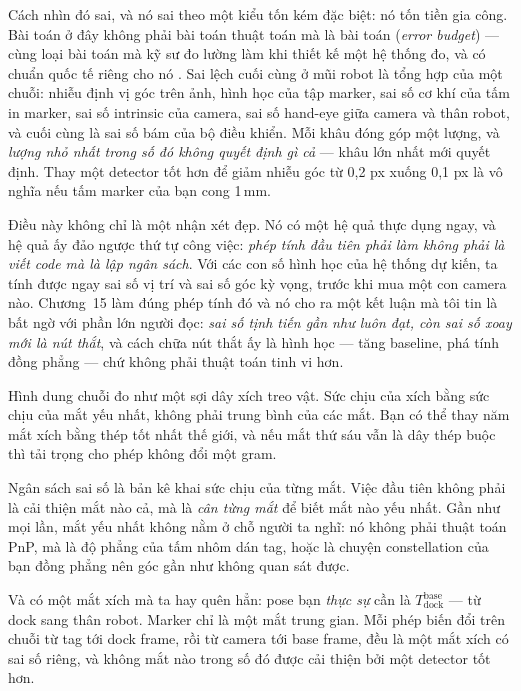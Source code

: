 \documentclass[marker.tex]{subfiles}
\begin{document}
Cách nhìn đó sai, và nó sai theo một kiểu tốn kém đặc biệt: nó tốn tiền gia công. Bài toán ở đây không phải bài toán thuật toán mà là bài toán  (\emph{error budget}) --- cùng loại bài toán mà kỹ sư đo lường làm khi thiết kế một hệ thống đo, và có chuẩn quốc tế riêng cho nó \cite{jcgm2008gum}. Sai lệch cuối cùng ở mũi robot là tổng hợp của một chuỗi: nhiễu định vị góc trên ảnh, hình học của tập marker, sai số cơ khí của tấm in marker, sai số intrinsic của camera, sai số hand-eye giữa camera và thân robot, và cuối cùng là sai số bám của bộ điều khiển. Mỗi khâu đóng góp một lượng, và \emph{lượng nhỏ nhất trong số đó không quyết định gì cả} --- khâu lớn nhất mới quyết định. Thay một detector tốt hơn để giảm nhiễu góc từ 0,2 px xuống 0,1 px là vô nghĩa nếu tấm marker của bạn cong 1\,mm.

Điều này không chỉ là một nhận xét đẹp. Nó có một hệ quả thực dụng ngay, và hệ quả ấy đảo ngược thứ tự công việc: \emph{phép tính đầu tiên phải làm không phải là viết code mà là lập ngân sách}. Với các con số hình học của hệ thống dự kiến, ta tính được ngay sai số vị trí và sai số góc kỳ vọng, trước khi mua một con camera nào. Chương~15 làm đúng phép tính đó và nó cho ra một kết luận mà tôi tin là bất ngờ với phần lớn người đọc: \emph{sai số tịnh tiến gần như luôn đạt, còn sai số xoay mới là nút thắt}, và cách chữa nút thắt ấy là hình học --- tăng baseline, phá tính đồng phẳng --- chứ không phải thuật toán tinh vi hơn.

\begin{trucgiac}
Hình dung chuỗi đo như một sợi dây xích treo vật. Sức chịu của xích bằng sức chịu của mắt yếu nhất, không phải trung bình của các mắt. Bạn có thể thay năm mắt xích bằng thép tốt nhất thế giới, và nếu mắt thứ sáu vẫn là dây thép buộc thì tải trọng cho phép không đổi một gram.

Ngân sách sai số là bản kê khai sức chịu của từng mắt. Việc đầu tiên không phải là cải thiện mắt nào cả, mà là \emph{cân từng mắt} để biết mắt nào yếu nhất. Gần như mọi lần, mắt yếu nhất không nằm ở chỗ người ta nghĩ: nó không phải thuật toán PnP, mà là độ phẳng của tấm nhôm dán tag, hoặc là chuyện constellation của bạn đồng phẳng nên góc gần như không quan sát được.

Và có một mắt xích mà ta hay quên hẳn: pose bạn \emph{thực sự} cần là \(T_{\text{dock}}^{\text{base}}\) --- từ dock sang thân robot. Marker chỉ là một mắt trung gian. Mỗi phép biến đổi trên chuỗi từ tag tới dock frame, rồi từ camera tới base frame, đều là một mắt xích có sai số riêng, và không mắt nào trong số đó được cải thiện bởi một detector tốt hơn.
\end{trucgiac}
\end{document}
